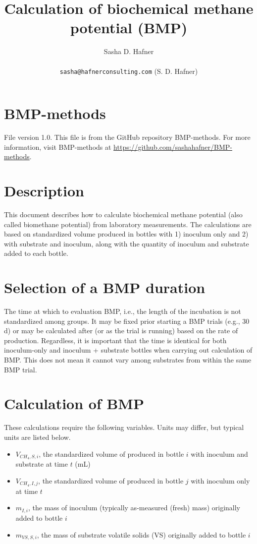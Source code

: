 \documentclass[]{article}
\title {Calculation of biochemical methane potential (BMP)}
\author{Sasha D. Hafner\\
\\
\texttt{sasha@hafnerconsulting.com} (S. D. Hafner)
}
\begin{document}
\maketitle

\section{BMP-methods}
File version 1.0. 
This file is from the GitHub repository BMP-methods.
For more information, visit BMP-methods at \url{https://github.com/sashahafner/BMP-methods}.

\section{Description}
This document describes how to calculate biochemical methane potential (also called biomethane potential) from laboratory measurements.
The calculations are based on standardized  volume produced in bottles with 1) inoculum only and 2) with substrate and inoculum, along with the quantity of inoculum and substrate added to each bottle.

\section{Selection of a BMP duration}
The time at which to evaluation BMP, i.e., the length of the incubation is not standardized among groups.
It may be fixed prior starting a BMP trials (e.g., 30 d) or may be calculated after (or as the trial is running) based on the rate of  production.
Regardless, it is important that the time is identical for both inoculum-only and inoculum + substrate bottles when carrying out calculation of BMP.
This does not mean it cannot vary among substrates from within the same BMP trial.

\section{Calculation of BMP}

These calculations require the following variables.
Units may differ, but typical units are listed below.
\begin{itemize}
  \item $V_{CH_4, S, i}$, the standardized volume of  produced in bottle $i$ with inoculum and substrate at time $t$ (mL)
  \item $V_{CH_4, I, j}$, the standardized volume of  produced in bottle $j$ with inoculum only at time $t$
  \item $m_{I, i}$, the mass of inoculum (typically as-measured (fresh) mass) originally added to bottle $i$
  \item $m_{VS, S, i}$, the mass of substrate volatile solids (VS) originally added to bottle $i$
\end{itemize}
\end{document}
